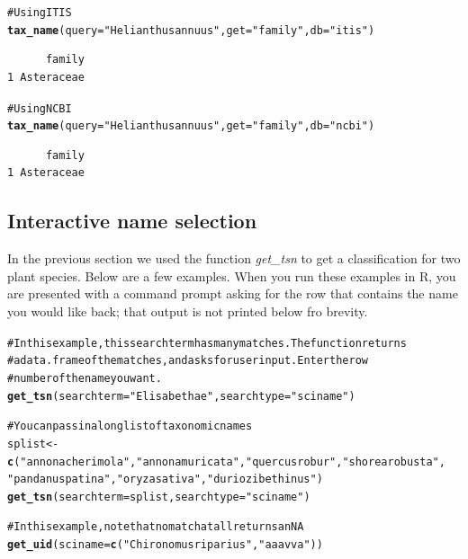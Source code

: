 \documentclass[letterpaper,superscriptaddress,showkeys,longbibliography,10pt]{revtex4-1}\usepackage{graphicx, color}
\makeatletter
\newcommand{\hlfunctioncall}[1]{\textcolor[rgb]{0.501960784313725,0,0.329411764705882}{\textbf{#1}}}%
\newcommand{\hlstring}[1]{\textcolor[rgb]{0.6,0.6,1}{#1}}%
\newcommand{\hlcomment}[1]{\textcolor[rgb]{0.180392156862745,0.6,0.341176470588235}{#1}}%
\newenvironment{kframe}{%
 \def\at@end@of@kframe{}%
 \ifinner\ifhmode%
  \def\at@end@of@kframe{\end{minipage}}%
  \begin{minipage}{\columnwidth}%
 \fi\fi%
 \def\FrameCommand##1{\hskip\@totalleftmargin \hskip-\fboxsep
 \colorbox{shadecolor}{##1}\hskip-\fboxsep
     \hskip-\linewidth \hskip-\@totalleftmargin \hskip\columnwidth}%
 \MakeFramed {\advance\hsize-\width
   \@totalleftmargin\z@ \linewidth\hsize
   \@setminipage}}%
 {\par\unskip\endMakeFramed%
 \at@end@of@kframe}
\newenvironment{knitrout}{}{} %
\makeatother
\begin{document}
\begin{knitrout}
\color{fgcolor}\begin{kframe}
\begin{alltt}
\hlcomment{# Using ITIS}
\hlfunctioncall{tax_name}(query = \hlstring{"Helianthus annuus"}, get = \hlstring{"family"}, db = \hlstring{"itis"})
\end{alltt}
\begin{verbatim}
      family
1 Asteraceae
\end{verbatim}
\begin{alltt}

\hlcomment{# Using NCBI}
\hlfunctioncall{tax_name}(query = \hlstring{"Helianthus annuus"}, get = \hlstring{"family"}, db = \hlstring{"ncbi"})
\end{alltt}
\begin{verbatim}
      family
1 Asteraceae
\end{verbatim}
\end{kframe}
\end{knitrout}


\subsection{Interactive name selection}

In the previous section we used the function \emph{get\_tsn} to get a classification for two plant species. Below are a few examples. When you run these examples in R, you are presented with a command prompt asking for the row that contains the name you would like back; that output is not printed below fro brevity.

\begin{knitrout}
\color{fgcolor}\begin{kframe}
\begin{alltt}
\hlcomment{# In this example, this search term has many matches. The function returns}
\hlcomment{# a data.frame of the matches, and asks for user input. Enter the row}
\hlcomment{# number of the name you want.}
\hlfunctioncall{get_tsn}(searchterm = \hlstring{"Elisabethae"}, searchtype = \hlstring{"sciname"})

\hlcomment{# You can pass in a long list of taxonomic names}
splist <- \hlfunctioncall{c}(\hlstring{"annona cherimola"}, \hlstring{"annona muricata"}, \hlstring{"quercus robur"}, \hlstring{"shorea robusta"}, 
    \hlstring{"pandanus patina"}, \hlstring{"oryza sativa"}, \hlstring{"durio zibethinus"})
\hlfunctioncall{get_tsn}(searchterm = splist, searchtype = \hlstring{"sciname"})

\hlcomment{# In this example, note that no match at all returns an NA}
\hlfunctioncall{get_uid}(sciname = \hlfunctioncall{c}(\hlstring{"Chironomus riparius"}, \hlstring{"aaa vva"}))
\end{alltt}
\end{kframe}
\end{knitrout}
\end{document}

